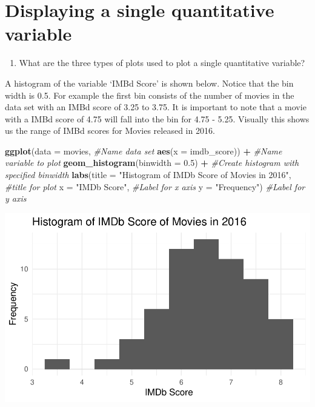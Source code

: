 \documentclass[
]{report}
\newenvironment{Shaded}{\begin{snugshade}}{\end{snugshade}}
\newcommand{\CommentTok}[1]{\textcolor[rgb]{0.56,0.35,0.01}{\textit{#1}}}
\newcommand{\DataTypeTok}[1]{\textcolor[rgb]{0.13,0.29,0.53}{#1}}
\newcommand{\FloatTok}[1]{\textcolor[rgb]{0.00,0.00,0.81}{#1}}
\newcommand{\KeywordTok}[1]{\textcolor[rgb]{0.13,0.29,0.53}{\textbf{#1}}}
\newcommand{\NormalTok}[1]{#1}
\newcommand{\OperatorTok}[1]{\textcolor[rgb]{0.81,0.36,0.00}{\textbf{#1}}}
\newcommand{\StringTok}[1]{\textcolor[rgb]{0.31,0.60,0.02}{#1}}
\providecommand{\tightlist}{%
  \setlength{\itemsep}{0pt}\setlength{\parskip}{0pt}}
\begin{document}
\hypertarget{displaying-a-single-quantitative-variable}{%
\section{Displaying a single quantitative variable}\label{displaying-a-single-quantitative-variable}}

\begin{enumerate}
\def\labelenumi{\arabic{enumi}.}
\setcounter{enumi}{6}
\tightlist
\item
  What are the three types of plots used to plot a single quantitative variable?
\end{enumerate}

\newpage

A histogram of the variable `IMBd Score' is shown below. Notice that the bin width is 0.5. For example the first bin consists of the number of movies in the data set with an IMBd score of 3.25 to 3.75. It is important to note that a movie with a IMBd score of 4.75 will fall into the bin for 4.75 - 5.25. Visually this shows us the range of IMBd scores for Movies released in 2016.

\begin{Shaded}
\begin{Highlighting}[]
\KeywordTok{ggplot}\NormalTok{(}\DataTypeTok{data =}\NormalTok{ movies,   }\CommentTok{\#Name data set}
       \KeywordTok{aes}\NormalTok{(}\DataTypeTok{x =}\NormalTok{ imdb\_score)) }\OperatorTok{+}\StringTok{   }\CommentTok{\#Name variable to plot}
\StringTok{  }\KeywordTok{geom\_histogram}\NormalTok{(}\DataTypeTok{binwidth =} \FloatTok{0.5}\NormalTok{) }\OperatorTok{+}\StringTok{  }\CommentTok{\#Create histogram with specified binwidth}
\StringTok{  }\KeywordTok{labs}\NormalTok{(}\DataTypeTok{title =} \StringTok{"Histogram of IMDb Score of Movies in 2016"}\NormalTok{, }\CommentTok{\#title for plot}
       \DataTypeTok{x =} \StringTok{"IMDb Score"}\NormalTok{, }\CommentTok{\#Label for x axis}
       \DataTypeTok{y =} \StringTok{"Frequency"}\NormalTok{) }\CommentTok{\#Label for y axis}
\end{Highlighting}
\end{Shaded}

\begin{center}\includegraphics[width=0.6\linewidth]{04-EDA-quantitative_files/figure-latex/unnamed-chunk-3-1} \end{center}
\end{document}
